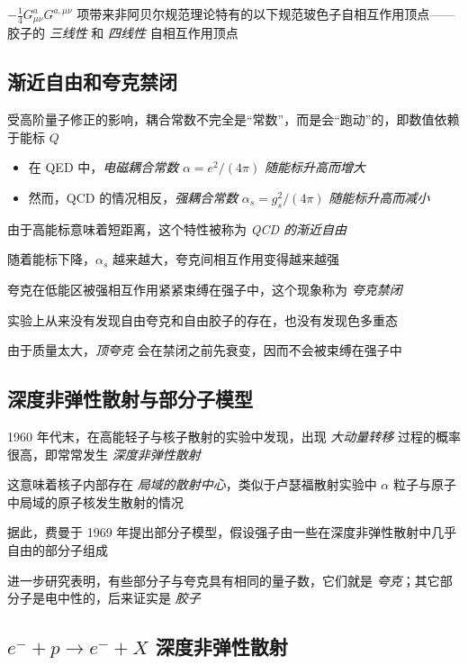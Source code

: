 \documentclass[oneside,a4paper,openany,11pt]{ctexbook}
\begin{document}
$-\frac{1}{4} G^a_{\mu\nu} G^{a, \mu\nu}$ 项带来非阿贝尔规范理论特有的以下规范玻色子自相互作用顶点——胶子的 \emph{三线性} 和 \emph{四线性} 自相互作用顶点

\subsection{渐近自由和夸克禁闭}

受高阶量子修正的影响，耦合常数不完全是“常数”，而是会“跑动”的，即数值依赖于能标 $Q$

\begin{itemize}
    \item 在 QED 中，\emph{电磁耦合常数} $\alpha=e^2 / (4\pi)$ \emph{随能标升高而增大}
    \item 然而，QCD 的情况相反，\emph{强耦合常数} $\alpha_s = g^2_s / (4\pi)$ \emph{随能标升高而减小}
\end{itemize}

由于高能标意味着短距离，这个特性被称为 \emph{QCD 的渐近自由}

随着能标下降，$\alpha_s$ 越来越大，夸克间相互作用变得越来越强

夸克在低能区被强相互作用紧紧束缚在强子中，这个现象称为 \emph{夸克禁闭}

实验上从来没有发现自由夸克和自由胶子的存在，也没有发现色多重态

由于质量太大，\emph{顶夸克} 会在禁闭之前先衰变，因而不会被束缚在强子中

\subsection{深度非弹性散射与部分子模型}

1960 年代末，在高能轻子与核子散射的实验中发现，出现 \emph{大动量转移} 过程的概率很高，即常常发生 \emph{深度非弹性散射}

这意味着核子内部存在 \emph{局域的散射中心}，类似于卢瑟福散射实验中 $\alpha$ 粒子与原子中局域的原子核发生散射的情况

据此，费曼于 1969 年提出部分子模型，假设强子由一些在深度非弹性散射中几乎自由的部分子组成

进一步研究表明，有些部分子与夸克具有相同的量子数，它们就是 \emph{夸克}；其它部分子是电中性的，后来证实是 \emph{胶子}

\subsection{\texorpdfstring{$e^- + p \to e^- + X$}{e-p -> e-X} 深度非弹性散射}
\end{document}
